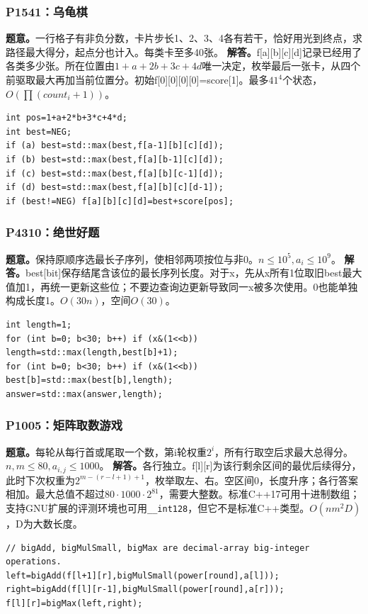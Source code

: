 \subsubsection{P1541：乌龟棋}
\textbf{题意。}一行格子有非负分数，卡片步长1、2、3、4各有若干，恰好用光到终点，求路径最大得分，起点分也计入。每类卡至多40张。
\textbf{解答。}f[a][b][c][d]记录已经用了各类多少张。所在位置由$1+a+2b+3c+4d$唯一决定，枚举最后一张卡，从四个前驱取最大再加当前位置分。初始f[0][0][0][0]=score[1]。最多$41^4$个状态，$O(\prod(count_i+1))$。
\begin{lstlisting}
int pos=1+a+2*b+3*c+4*d;
int best=NEG;
if (a) best=std::max(best,f[a-1][b][c][d]);
if (b) best=std::max(best,f[a][b-1][c][d]);
if (c) best=std::max(best,f[a][b][c-1][d]);
if (d) best=std::max(best,f[a][b][c][d-1]);
if (best!=NEG) f[a][b][c][d]=best+score[pos];
\end{lstlisting}

\subsubsection{P4310：绝世好题}
\textbf{题意。}保持原顺序选最长子序列，使相邻两项按位与非0。$n\le10^5,a_i\le10^9$。
\textbf{解答。}best[bit]保存结尾含该位的最长序列长度。对于x，先从x所有1位取旧best最大值加1，再统一更新这些位；不要边查询边更新导致同一x被多次使用。0也能单独构成长度1。$O(30n)$，空间$O(30)$。
\begin{lstlisting}
int length=1;
for (int b=0; b<30; b++) if (x&(1<<b)) length=std::max(length,best[b]+1);
for (int b=0; b<30; b++) if (x&(1<<b)) best[b]=std::max(best[b],length);
answer=std::max(answer,length);
\end{lstlisting}

\subsubsection{P1005：矩阵取数游戏}
\textbf{题意。}每轮从每行首或尾取一个数，第i轮权重$2^i$，所有行取空后求最大总得分。$n,m\le80,a_{i,j}\le1000$。
\textbf{解答。}各行独立。f[l][r]为该行剩余区间的最优后续得分，此时下次权重为$2^{m-(r-l+1)+1}$，枚举取左、右。空区间0，长度升序；各行答案相加。最大总值不超过$80\cdot1000\cdot2^{81}$，需要大整数。标准C++17可用十进制数组；支持GNU扩展的评测环境也可用\texttt{\_\_int128}，但它不是标准C++类型。$O(nm^2D)$，D为大数长度。
\begin{lstlisting}
// bigAdd, bigMulSmall, bigMax are decimal-array big-integer operations.
left=bigAdd(f[l+1][r],bigMulSmall(power[round],a[l]));
right=bigAdd(f[l][r-1],bigMulSmall(power[round],a[r]));
f[l][r]=bigMax(left,right);
\end{lstlisting}

